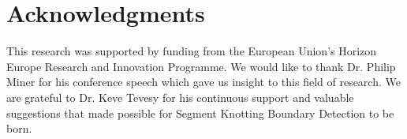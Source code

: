 \section{Acknowledgments}
\label{sec:acknowledgments}

This research was supported by funding from the European Union's Horizon Europe Research and Innovation Programme. We would like to thank Dr. Philip Miner for his conference speech which gave us insight to this field of research. We are grateful to Dr. Keve Tevesy for his continuous support and valuable suggestions that made possible for Segment Knotting Boundary Detection to be born.

